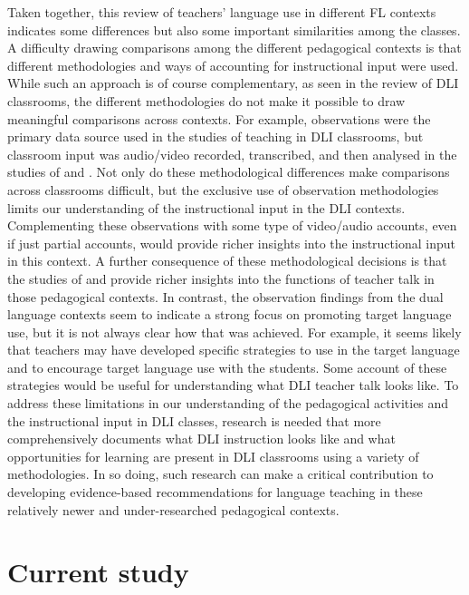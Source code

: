 \documentclass[output=paper,chinesefont]{langscibook}
\begin{document}
Taken together, this review of teachers’ language use in different FL contexts indicates some differences but also some important similarities among the classes. A difficulty drawing comparisons among the different pedagogical contexts is that different methodologies and ways of accounting for instructional input were used. While such an approach is of course complementary, as seen in the review of DLI classrooms, the different methodologies do not make it possible to draw meaningful comparisons across contexts. For example, observations were the primary data source used in the studies of teaching in DLI classrooms, but classroom input was audio/video recorded, transcribed, and then analysed in the studies of \citet{CollinsEtAl2012} and \citet{Huensch2019}. Not only do these methodological differences make comparisons across classrooms difficult, but the exclusive use of observation methodologies limits our understanding of the instructional input in the DLI contexts. Complementing these observations with some type of video/audio accounts, even if just partial accounts, would provide richer insights into the instructional input in this context. A further consequence of these methodological decisions is that the studies of \citet{CollinsEtAl2012} and \citet{Huensch2019} provide richer insights into the functions of teacher talk in those pedagogical contexts. In contrast, the observation findings from the dual language contexts seem to indicate a strong focus on promoting target language use, but it is not always clear how that was achieved. For example, it seems likely that teachers may have developed specific strategies to use in the target language and to encourage target language use with the students. Some account of these strategies would be useful for understanding what DLI teacher talk looks like. To address these limitations in our understanding of the pedagogical activities and the instructional input in DLI classes, research is needed that more comprehensively documents what DLI instruction looks like and what opportunities for learning are present in DLI classrooms using a variety of methodologies. In so doing, such research can make a critical contribution to developing evidence-based recommendations for language teaching in these relatively newer and under-researched pedagogical contexts. 

\section{Current study}
\end{document}
